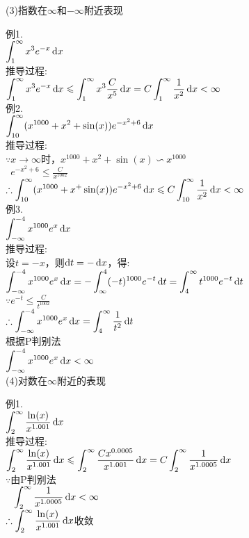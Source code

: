(3)指数在$\infty$和$-\infty$附近表现\\
\begin{center}
\end{center}
例1.\\
$\displaystyle\int_1^{\infty}x^3e^{-x}\mathop{}\!\mathrm{d} x$\\
推导过程:\\
$\displaystyle\int_1^{\infty}x^3e^{-x}\mathop{}\!\mathrm{d} x\leqslant\int_1^{\infty}x^3\frac{C}{x^5}\mathop{}\!\mathrm{d} x=C\int_1^{\infty}\frac{1}{x^2}\mathop{}\!\mathrm{d} x<\infty$\\[1ex]

例2.\\
$\displaystyle\int_{10}^{\infty}(x^{1000}+x^2+\sin(x))e^{-x^2+6}\mathop{}\!\mathrm{d} x$\\
推导过程:\\
$\because x\to\infty$时，$x^{1000}+x^2+\sin(x)\backsim x^{1000}$\\
$\displaystyle\phantom{\because}e^{-x^2+6}\leqslant\frac{C}{x^{1002}}$\\
$\displaystyle\therefore\int_{10}^{\infty}(x^{1000}+x^+\sin(x))e^{-x^2+6}\mathop{}\!\mathrm{d} x\leqslant C\int_{10}^{\infty}\frac{1}{x^2}\mathop{}\!\mathrm{d} x<\infty$\\[1ex]

例3.\\
$\displaystyle\int_{-\infty}^{-4}x^{1000}e^x\mathop{}\!\mathrm{d} x$\\
推导过程:\\
设$t=-x$，则$\mathop{}\!\mathrm{d} t=-\mathop{}\!\mathrm{d} x$，得:\\
$\displaystyle\int_{-\infty}^{-4}x^{1000}e^x\mathop{}\!\mathrm{d} x=-\int_{\infty}^4(-t)^{1000}e^{-t}\mathop{}\!\mathrm{d} t=\int_4^{\infty}t^{1000}e^{-t}\mathop{}\!\mathrm{d} t$\\
$\displaystyle\because e^{-t}\leqslant\frac{C}{t^{1002}}$\\
$\displaystyle\therefore\int_{-\infty}^{-4}x^{1000}e^x\mathop{}\!\mathrm{d} x=\int_4^{\infty}\frac{1}{t^2}\mathop{}\!\mathrm{d} t$\\
根据P判别法\\
$\displaystyle\int_{-\infty}^{-4}x^{1000}e^x\mathop{}\!\mathrm{d} x<\infty$\\[2ex]

(4)对数在$\infty$附近的表现\\
\begin{center}
\end{center}
例1.\\
$\displaystyle\int_2^{\infty}\frac{\ln(x)}{x^{1.001}}\mathop{}\!\mathrm{d} x$\\
推导过程:\\
$\displaystyle\int_2^{\infty}\frac{\ln(x)}{x^{1.001}}\mathop{}\!\mathrm{d} x\leqslant\int_2^{\infty}\frac{Cx^{0.0005}}{x^{1.001}}\mathop{}\!\mathrm{d} x=C\int_2^{\infty}\frac{1}{x^{1.0005}}\mathop{}\!\mathrm{d} x$\\
$\because$由P判别法\\
$\displaystyle\phantom{\because}\int_2^{\infty}\frac{1}{x^{1.0005}}\mathop{}\!\mathrm{d} x<\infty$\\
$\displaystyle\therefore\int_2^{\infty}\frac{\ln(x)}{x^{1.001}}\mathop{}\!\mathrm{d} x$收敛\\[1ex]

